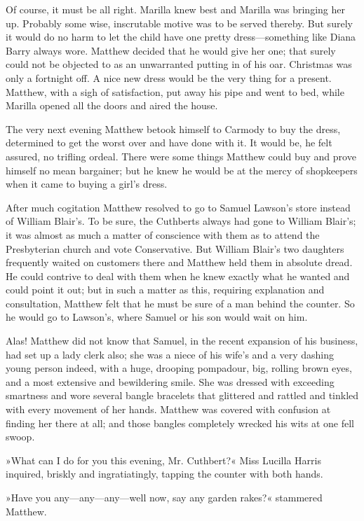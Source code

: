 Of course, it must be all right. Marilla knew best and Marilla was bringing her up. Probably some wise, inscrutable motive was to be served thereby. But surely it would do no harm to let the child have one pretty dress—something like Diana Barry always wore. Matthew decided that he would give her one; that surely could not be objected to as an unwarranted putting in of his oar. Christmas was only a fortnight off. A nice new dress would be the very thing for a present. Matthew, with a sigh of satisfaction, put away his pipe and went to bed, while Marilla opened all the doors and aired the house.

The very next evening Matthew betook himself to Carmody to buy the dress, determined to get the worst over and have done with it. It would be, he felt assured, no trifling ordeal. There were some things Matthew could buy and prove himself no mean bargainer; but he knew he would be at the mercy of shopkeepers when it came to buying a girl’s dress.

After much cogitation Matthew resolved to go to Samuel Lawson’s store instead of William Blair’s. To be sure, the Cuthberts always had gone to William Blair’s; it was almost as much a matter of conscience with them as to attend the Presbyterian church and vote Conservative. But William Blair’s two daughters frequently waited on customers there and Matthew held them in absolute dread. He could contrive to deal with them when he knew exactly what he wanted and could point it out; but in such a matter as this, requiring explanation and consultation, Matthew felt that he must be sure of a man behind the counter. So he would go to Lawson’s, where Samuel or his son would wait on him.

Alas! Matthew did not know that Samuel, in the recent expansion of his business, had set up a lady clerk also; she was a niece of his wife’s and a very dashing young person indeed, with a huge, drooping pompadour, big, rolling brown eyes, and a most extensive and bewildering smile. She was dressed with exceeding smartness and wore several bangle bracelets that glittered and rattled and tinkled with every movement of her hands. Matthew was covered with confusion at finding her there at all; and those bangles completely wrecked his wits at one fell swoop.

»What can I do for you this evening, Mr. Cuthbert?« Miss Lucilla Harris inquired, briskly and ingratiatingly, tapping the counter with both hands.

»Have you any—any—any—well now, say any garden rakes?« stammered Matthew.

